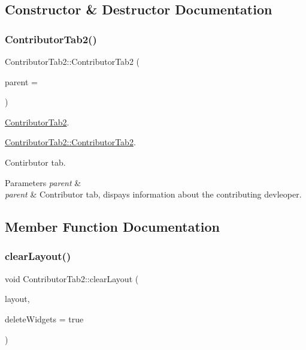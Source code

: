 \subsection{Constructor \& Destructor Documentation}
\mbox{\label{classContributorTab2_afb63f19687c265fe4fc325040cc2d8d7}} 
\subsubsection{\texorpdfstring{Contributor\+Tab2()}{ContributorTab2()}}
{\footnotesize\ttfamily Contributor\+Tab2\+::\+Contributor\+Tab2 (\begin{DoxyParamCaption}\item[{Q\+Widget $\ast$}]{parent = {} }\end{DoxyParamCaption})}



\hyperlink{classContributorTab2}{Contributor\+Tab2}. 

\hyperlink{classContributorTab2_afb63f19687c265fe4fc325040cc2d8d7}{Contributor\+Tab2\+::\+Contributor\+Tab2}.

Contirbutor tab. 
\begin{DoxyParams}{Parameters}
{\em parent} & \\
\hline
{\em parent} & Contributor tab, dispays information about the contributing devleoper. \\
\hline
\end{DoxyParams}


\subsection{Member Function Documentation}
\mbox{\label{classContributorTab2_a7bc323cf603d03913d96ade9536d8f7e}} 
\subsubsection{\texorpdfstring{clear\+Layout()}{clearLayout()}}
{\footnotesize\ttfamily void Contributor\+Tab2\+::clear\+Layout (\begin{DoxyParamCaption}\item[{Q\+Layout $\ast$}]{layout,  }\item[{bool}]{delete\+Widgets = {\ttfamily true} }\end{DoxyParamCaption})\hspace{0.3cm}{\ttfamily [protected]}}



